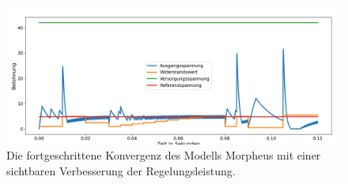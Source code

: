 \begin{figure}[htbp]
\centering
\includegraphics[width=\textwidth, trim=12px 12px 12px 12px, clip]{4Ergebnisse/Phasen/2Phase/TeilIV.png}
\caption{Die fortgeschrittene Konvergenz des Modells Morpheus mit einer sichtbaren Verbesserung der Regelungsleistung. }
\label{fig:advanced_convergence_morpheus}
\end{figure}
